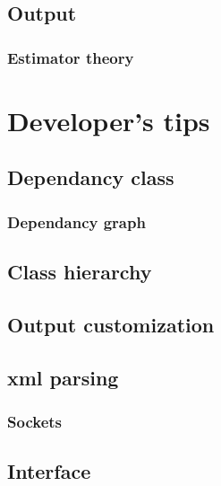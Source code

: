 \documentclass[12pt,fleqn]{report}
\begin{document}
\section{Output}
\subsection{Estimator theory}

\chapter{Developer's tips}
\section{Dependancy class}
\subsection{Dependancy graph}
\section{Class hierarchy}
\section{Output customization}
\section{xml parsing}
\subsection{Sockets}
\section{Interface}

\begin{thebibliography}{99}
\end{thebibliography}
\end{document}
